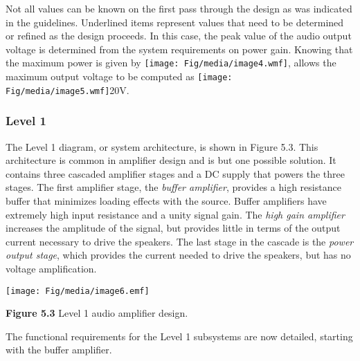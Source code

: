 Not all values can be known on the first pass through the design as was
indicated in the guidelines. Underlined items represent values that need
to be determined or refined as the design proceeds. In this case, the
peak value of the audio output voltage is determined from the system
requirements on power gain. Knowing that the maximum power is given by
\texttt{[image: Fig/media/image4.wmf]}, allows the maximum output
voltage to be computed as \texttt{[image: Fig/media/image5.wmf]}20V.

\subsubsection*{Level 1}\label{level-1}

The Level 1 diagram, or system architecture, is shown in Figure 5.3.
This architecture is common in amplifier design and is but one possible
solution. It contains three cascaded amplifier stages and a DC supply
that powers the three stages. The first amplifier stage, the
\emph{buffer amplifier}, provides a high resistance buffer that
minimizes loading effects with the source. Buffer amplifiers have
extremely high input resistance and a unity signal gain. The \emph{high
gain amplifier} increases the amplitude of the signal, but provides
little in terms of the output current necessary to drive the speakers.
The last stage in the cascade is the \emph{power output stage}, which
provides the current needed to drive the speakers, but has no voltage
amplification.

\texttt{[image: Fig/media/image6.emf]}

\textbf{Figure 5.3} Level 1 audio amplifier design.

The functional requirements for the Level 1 subsystems are now detailed,
starting with the buffer amplifier.


